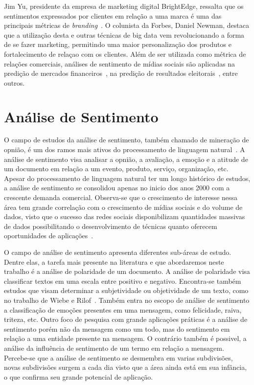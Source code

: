 Jim Yu, presidente da empresa de marketing digital BrightEdge, ressalta que os sentimentos expressados por clientes em
relação a uma marca é uma das principais métricas de \textit{branding}~\cite{marketingland}.
O colunista da Forbes, Daniel Newman, destaca que a utilização desta e outras técnicas de big data vem revolucionando
a forma de se fazer marketing, permitindo uma maior personalização dos produtos e fortalecimento de relaçao com os
clientes.
Além de ser utilizada como métrica de relações comerciais, análises de sentimento de mídias sociais são aplicadas na
predição de mercados financeiros~\cite{bollen11}, na predição de resultados eleitorais~\cite{tumasjan10}, entre outros.

\section{Análise de Sentimento}

O campo de estudos da análise de sentimento, também chamado de mineração de opnião, é um dos ramos mais ativos do
processamento de linguagem natural~\cite{liu12}.
A análise de sentimento visa analisar a opnião, a avaliação, a emoção e  a atitude de um documento em relação a um
evento, produto, serviço, organização, etc.
Apesar do processamento de linguagem natural ter um longo histórico de estudos, a análise de sentimento se consolidou
apenas no inicio dos anos 2000 com a crescente demanda comercial.
Observa-se que o crescimento de interesse nessa área tem grande correlação com o crescimento de mídias sociais e do
volume de dados, visto que o sucesso das redes sociais disponibilizam quantidades massivas de dados possibilitando o
desenvolvimento de técnicas quanto oferecem oportunidades de aplicações~\cite{liu12}.

O campo de análise de sentimento apresenta diferentes sub-áreas de estudo.
Dentre elas, a tarefa mais presente na literatura e que abordaremos neste trabalho é a análise de polaridade de um
documento.
A análise de polaridade visa classificar textos em uma escala entre positivo e negativo.
Encontra-se também estudos que visam determinar a subjetividade ou objetividade de um texto, como no trabalho de Wiebe e
Rilof~\cite{Wiebe05}.
Também entra no escopo de análise de sentimento a classificação de emoções presentes em uma mensagem, como felicidade,
raiva, triteza, etc.
Outro foco de pesquisa com grande aplicações práticas é a análise de sentimento porém não da mensagem como um todo, mas
do sentimento em relação a uma entidade presente na mensagem.
O contrário também é possivel, a análise da influência de sentimento de um termo em relação a mensagem.
Percebe-se que a análise de sentimento se desmembra em varias subdivisões, novas subdivisões surgem a cada dia visto que
a área ainda está em sua infância, o que confirma seu grande potencial de aplicação.

